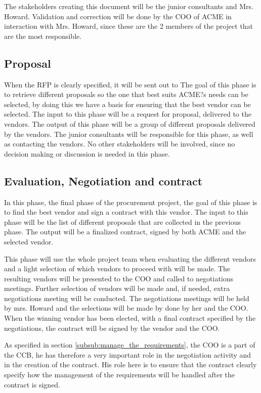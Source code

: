 \documentclass[a4paper]{article}
\begin{document}
The stakeholders creating this document will be the junior consultants and Mrs. Howard. Validation and correction will be done by the COO of ACME in interaction with Mrs. Howard, since these are the 2 members of the project that are the most responsible.

\subsection{Proposal}
\label{sub:proposal}
When the RFP is clearly specified, it will be sent out to 
The goal of this phase is to retrieve different proposals so the one that best suits ACME?s needs can be selected, by doing this we have a basis for ensuring that the best vendor can be selected. The input to this phase will be a request for proposal, delivered to the vendors. The output of this phase will be a group of different proposals delivered by the vendors. The junior consultants will be responsible for this phase, as well as contacting the vendors. No other stakeholders will be involved, since no decision making or discussion is needed in this phase.

\subsection{Evaluation, Negotiation and contract}
\label{sub:evaluation_negotiation_and_contract}
In this phase, the final phase of the procurement project, the goal of this phase is to find the best vendor and sign a contract with this vendor. The input to this phase will be the list of different proposals that are collected in the previous phase. The output will be a finalized contract, signed by both ACME and the selected vendor. 

This phase will use the whole project team when evaluating the different vendors and a light selection of which vendors to proceed with will be made. The resulting vendors will be presented to the COO and called to negotiations meetings. Further selection of vendors will be made and, if needed, extra negotiations meeting will be conducted. The negotiations meetings will be held by mrs. Howard and the selections will be made by done by her and the COO. When the winning vendor has been elected, with a final contract specified by the negotiations, the contract will be signed by the vendor and the COO.

As specified in section \ref{subsub:manage_the_requirements}, the COO is a part of the CCB, he has therefore a very important role in the negotiation activity and in the creation of the contract. His role here is to ensure that the contract clearly specify how the management of the requirements will be handled after the contract is signed.
 
\end{document}
